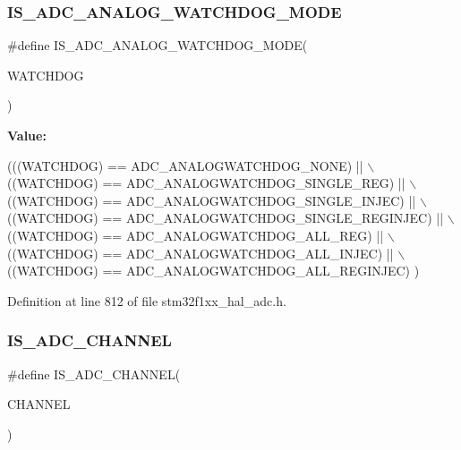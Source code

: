 \subsubsection{\texorpdfstring{I\+S\+\_\+\+A\+D\+C\+\_\+\+A\+N\+A\+L\+O\+G\+\_\+\+W\+A\+T\+C\+H\+D\+O\+G\+\_\+\+M\+O\+DE}{IS\_ADC\_ANALOG\_WATCHDOG\_MODE}}
{\footnotesize\ttfamily \#define I\+S\+\_\+\+A\+D\+C\+\_\+\+A\+N\+A\+L\+O\+G\+\_\+\+W\+A\+T\+C\+H\+D\+O\+G\+\_\+\+M\+O\+DE(\begin{DoxyParamCaption}\item[{}]{W\+A\+T\+C\+H\+D\+OG }\end{DoxyParamCaption})}

{\bfseries Value\+:}
\begin{DoxyCode}
(((WATCHDOG) == ADC\_ANALOGWATCHDOG\_NONE)             || \(\backslash\)
                                               ((WATCHDOG) == ADC\_ANALOGWATCHDOG\_SINGLE\_REG)       || \(\backslash\)
                                               ((WATCHDOG) == ADC\_ANALOGWATCHDOG\_SINGLE\_INJEC)     || \(\backslash\)
                                               ((WATCHDOG) == ADC\_ANALOGWATCHDOG\_SINGLE\_REGINJEC)  || \(\backslash\)
                                               ((WATCHDOG) == ADC\_ANALOGWATCHDOG\_ALL\_REG)          || \(\backslash\)
                                               ((WATCHDOG) == ADC\_ANALOGWATCHDOG\_ALL\_INJEC)        || \(\backslash\)
                                               ((WATCHDOG) == ADC\_ANALOGWATCHDOG\_ALL\_REGINJEC)       )
\end{DoxyCode}


Definition at line 812 of file stm32f1xx\+\_\+hal\+\_\+adc.\+h.

\mbox{\label{group___a_d_c___private___macros_gaba41910dcb2b449c613a5ef638862e77}} 
\subsubsection{\texorpdfstring{I\+S\+\_\+\+A\+D\+C\+\_\+\+C\+H\+A\+N\+N\+EL}{IS\_ADC\_CHANNEL}}
{\footnotesize\ttfamily \#define I\+S\+\_\+\+A\+D\+C\+\_\+\+C\+H\+A\+N\+N\+EL(\begin{DoxyParamCaption}\item[{}]{C\+H\+A\+N\+N\+EL }\end{DoxyParamCaption})}

